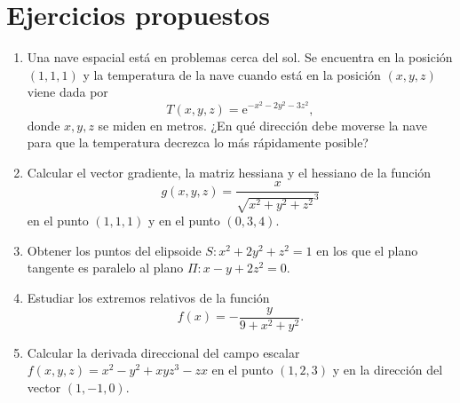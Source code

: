 \section{Ejercicios propuestos}
\begin{enumerate}[leftmargin=*]
\item Una nave espacial está en problemas cerca del sol.
      Se encuentra en la posición $(1,1,1)$ y la temperatura de la nave cuando está en la posición $(x,y,z)$ viene dada por
      \[T(x,y,z)=\mbox{e}^{-x^2-2y^2-3z^2},\]
      donde $x,y,z$ se miden en metros.
      ¿En qué dirección debe moverse la nave para que la temperatura decrezca lo más rápidamente posible?

\item Calcular el vector gradiente, la matriz hessiana y el hessiano de la función
      \[
      g(x,y,z) = \frac{x}{\sqrt{x^2+y^2+z^2}^3}
      \]
      en el punto $(1,1,1)$ y en el punto $(0,3,4)$.

\item Obtener los puntos del elipsoide $S: x^2+2y^2+z^2=1$ en los que el plano tangente es paralelo al plano $\Pi:
      x-y+2z^2=0$.

\item Estudiar los extremos relativos de la función
      \[
      f(x)=-\frac{y}{9+x^2+y^2}.
      \]

\item Calcular la derivada direccional del campo escalar $f(x,y,z)=x^2-y^2+xyz^3-zx$ en el punto $(1,2,3)$ y en la
      dirección del vector $(1,-1,0)$.
\end{enumerate}
